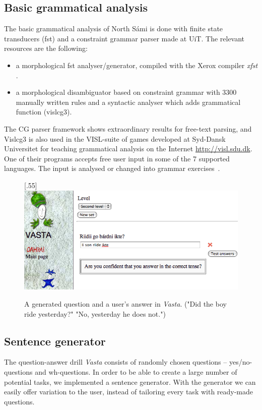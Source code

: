 \documentclass[11pt]{article}
\begin{document}
\subsection{Basic grammatical analysis}
The basic grammatical analysis of North Sámi is done with finite state transducers (fst) and a constraint grammar parser made at UiT. The relevant resources are the following:
\begin{itemize}
\item a morphological fst analyser/generator, compiled with the Xerox compiler \textit{xfst} \cite{BeesleyKarttunen:03}.  
\item a morphological disambiguator based on constraint grammar with 3300 manually written rules and a syntactic analyser which adds grammatical function (vislcg3). 
\end{itemize} 

The CG parser framework shows extraordinary results for free-text parsing, and Vislcg3 is also used in the VISL-suite of games developed at Syd-Dansk Universitet for teaching grammatical analysis on the Internet \url{http://visl.sdu.dk}. One of their  programs accepts free user input in some of the 7 supported languages. The input is analysed or changed into grammar exercises~\cite{Bick:05}.


\begin{figure}[htbp]
\begin{center}
\scalebox{.55}[.55]{\includegraphics{presentation/img/newvasta.png}}\\
\caption{A generated question and a user's answer in \textit{Vasta}. ("Did the boy ride yesterday?" "No, yesterday he does not.")}
\label{vastasent}
\end{center}
\end{figure}


\subsection{Sentence generator}
The question-answer drill \textit{Vasta} consists of randomly chosen questions -- yes/no-questions and wh-questions. In order to be able to create a large number of potential tasks, we implemented a sentence generator. With the generator we can easily offer variation to the user, instead of tailoring every task with ready-made questions.
\end{document}
